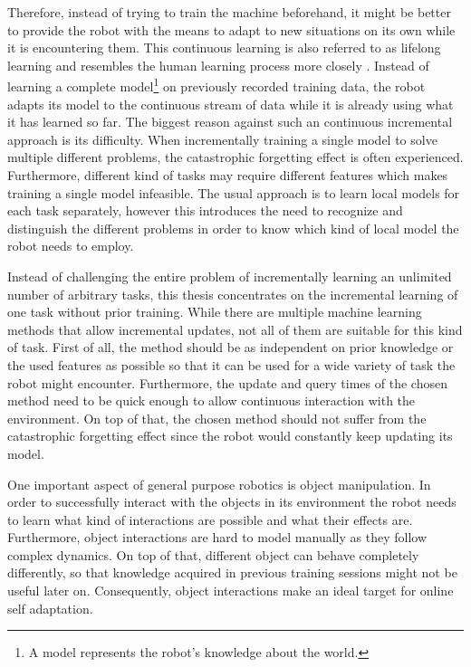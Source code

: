 Therefore, instead of trying to train the machine beforehand, it might be better to provide the robot with the means to adapt to new situations on its own while it is encountering them. 
This continuous learning is also referred to as lifelong learning and resembles the human learning process more closely \cite{silver2013lifelong}.
Instead of learning a complete model\footnote{A model represents the robot's knowledge about the world.} on previously recorded training data, the robot adapts its model to the continuous stream of data while it is already using what it has learned so far. 
The biggest reason against such an continuous incremental approach is its difficulty. When incrementally training a single model to solve multiple different problems, the catastrophic forgetting effect is often experienced. Furthermore, different kind of tasks may require different features which makes training a single model infeasible. The usual approach is to learn local models for each task separately, however this introduces the need to recognize and distinguish the different problems in order to know which kind of local model the robot needs to employ.

Instead of challenging the entire problem of incrementally learning an unlimited number of arbitrary tasks, this thesis concentrates on the incremental learning of one task without prior training. 
While there are multiple machine learning methods that allow incremental updates, not all of them are suitable for this kind of task. 
First of all, the method should be as independent on prior knowledge or the used features as possible so that it can be used for a wide variety of task the robot might encounter. Furthermore, the update and query times of the chosen method need to be quick enough to allow continuous interaction with the environment. On top of that, the chosen method should not suffer from the catastrophic forgetting effect since the robot would constantly keep updating its model. 

One important aspect of general purpose robotics is object manipulation. In order to successfully interact with the objects in its environment the robot needs to learn what kind of interactions are possible and what their effects are. 
Furthermore, object interactions are hard to model manually as they follow complex dynamics. On top of that, different object can behave completely differently, so that knowledge acquired in previous training sessions might not be useful later on. Consequently, object interactions make an ideal target for online self adaptation. 

